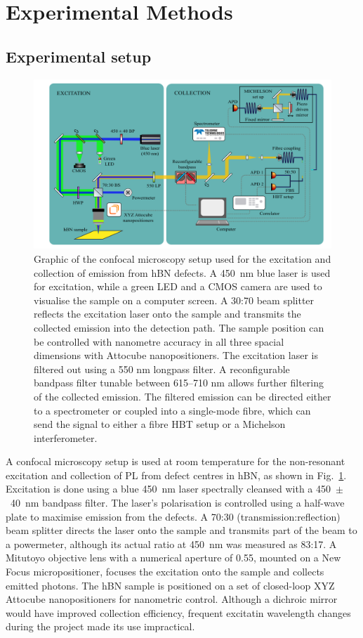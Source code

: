 \section{Experimental Methods}

\subsection{\label{sec:setup} Experimental setup}

\begin{figure}[h]
    \centering
    \includegraphics[width=1\linewidth]{Figures/ExperimentalSetUp.png}
    \caption{Graphic of the confocal microscopy setup used for the excitation and collection of emission from hBN defects. A 450~nm blue laser is used for excitation, while a green LED and a CMOS camera are used to visualise the sample on a computer screen. A 30:70 beam splitter reflects the excitation laser onto the sample and transmits the collected emission into the detection path. The sample position can be controlled with nanometre accuracy in all three spacial dimensions with Attocube nanopositioners. The excitation laser is filtered out using a 550 nm longpass filter. A reconfigurable bandpass filter tunable between 615--710 nm allows further filtering of the collected emission. The filtered emission can be directed either to a spectrometer or coupled into a single-mode fibre, which can send the signal to either a fibre HBT setup or a Michelson interferometer.}
    \label{fig:setup}
\end{figure}

A confocal microscopy setup is used at room temperature for the non-resonant excitation and collection of PL from defect centres in hBN, as shown in Fig.~\ref{fig:setup}. Excitation is done using a blue 450~nm laser spectrally cleansed with a 450~$\pm$~40~nm bandpass filter. The laser’s polarisation is controlled using a half-wave plate to maximise emission from the defects. A 70:30 (transmission:reflection) beam splitter directs the laser onto the sample and transmits part of the beam to a powermeter, although its actual ratio at 450~nm was measured as 83:17. A Mitutoyo objective lens with a numerical aperture of 0.55, mounted on a New Focus micropositioner, focuses the excitation onto the sample and collects emitted photons. The hBN sample is positioned on a set of closed-loop XYZ Attocube nanopositioners for nanometric control. Although a dichroic mirror would have improved collection efficiency, frequent excitatin wavelength changes during the project made its use impractical.

